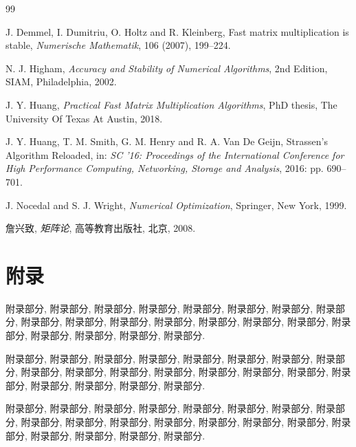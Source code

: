 \documentclass[openany]{MathematicalModelCaseStudyReport}  %
\let\cleardoublepage\clearpage
\numberwithin{algorithm}{chapter}
\begin{document}
\linespread{1.1}\selectfont
\begin{thebibliography}{99}
\thispagestyle{plain}

\newblock J. Demmel, I. Dumitriu, O. Holtz and R. Kleinberg,
\newblock Fast matrix multiplication is stable,
\newblock \emph{Numerische Mathematik}, 106 (2007), 199--224.

\newblock N. J. Higham,
\newblock \emph{Accuracy and Stability of Numerical Algorithms}, 2nd Edition,
\newblock SIAM, Philadelphia, 2002.

\newblock J. Y. Huang,
\newblock \emph{Practical Fast Matrix Multiplication Algorithms},
\newblock PhD thesis, The University Of Texas At Austin, 2018.

\newblock J. Y. Huang, T. M. Smith, G. M. Henry and R. A. Van De Geijn,
\newblock Strassen's Algorithm Reloaded,
\newblock in: \emph{SC '16: Proceedings of the International Conference for High Performance Computing,
Networking, Storage and Analysis}, 2016: pp. 690--701.

\newblock J. Nocedal and S. J. Wright,
\newblock \emph{Numerical Optimization},
\newblock Springer, New York, 1999.

\newblock 詹兴致,
\newblock \emph{矩阵论},
\newblock 高等教育出版社, 北京, 2008.

\end{thebibliography}

\clearpage{\pagestyle{empty}\cleardoublepage}
\linespread{1.4}\selectfont
\chapter*{附录}

附录部分, 附录部分, 附录部分, 附录部分, 附录部分,
附录部分, 附录部分, 附录部分, 附录部分, 附录部分,
附录部分, 附录部分, 附录部分, 附录部分, 附录部分,
附录部分, 附录部分, 附录部分, 附录部分, 附录部分.

附录部分, 附录部分, 附录部分, 附录部分, 附录部分,
附录部分, 附录部分, 附录部分, 附录部分, 附录部分,
附录部分, 附录部分, 附录部分, 附录部分, 附录部分,
附录部分, 附录部分, 附录部分, 附录部分, 附录部分.

附录部分, 附录部分, 附录部分, 附录部分, 附录部分,
附录部分, 附录部分, 附录部分, 附录部分, 附录部分,
附录部分, 附录部分, 附录部分, 附录部分, 附录部分,
附录部分, 附录部分, 附录部分, 附录部分, 附录部分.
\end{document}
